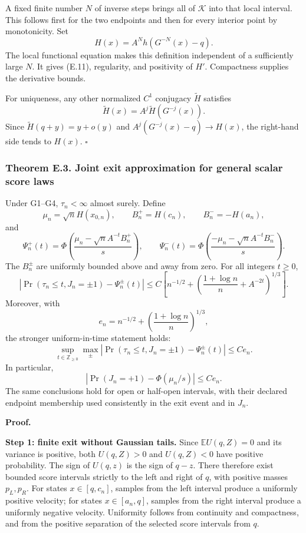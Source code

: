 A fixed finite number \(N\) of inverse steps brings all of
\(\mathcal K\) into that local interval. This follows first for the two
endpoints and then for every interior point by monotonicity. Set \[
H(x)=A^N h(G^{-N}(x)-q).
\tag{E.13}
\] The local functional equation makes this definition independent of a
sufficiently large \(N\). It gives (E.11), regularity, and positivity of
\(H'\). Compactness supplies the derivative bounds.

For uniqueness, any other normalized \(C^1\) conjugacy \(\widetilde H\)
satisfies \[
\widetilde H(x)=A^j\widetilde H(G^{-j}(x)).
\] Since \(\widetilde H(q+y)=y+o(y)\) and \(A^j(G^{-j}(x)-q)\to H(x)\),
the right-hand side tends to \(H(x)\). \(\square\)

\subsubsection{Theorem E.3. Joint exit approximation for general scalar
score
laws}\label{scalar_exit-theorem-e.3.-joint-exit-approximation-for-general-scalar-score-laws}

Under G1--G4, \(\tau_n<\infty\) almost surely. Define \[
\mu_n=\sqrt n H(x_{0,n}),\qquad
B_n^+=H(c_n),\qquad B_n^-=-H(a_n),
\tag{E.14}
\] and \[
\Psi_n^+(t)=
\Phi\!\left(\frac{\mu_n-\sqrt n A^{-t}B_n^+}{s}\right),
\qquad
\Psi_n^-(t)=
\Phi\!\left(\frac{-\mu_n-\sqrt n A^{-t}B_n^-}{s}\right).
\tag{E.15}
\] The \(B_n^\pm\) are uniformly bounded above and away from zero. For
all integers \(t\ge0\), \[
\left|\Pr(\tau_n\le t,J_n=\pm1)-\Psi_n^\pm(t)\right|
\le C\left[n^{-1/2}+
\left(\frac{1+\log n}{n}+A^{-2t}\right)^{1/3}\right].
\tag{E.16}
\] Moreover, with \[
e_n=n^{-1/2}+\left(\frac{1+\log n}{n}\right)^{1/3},
\tag{E.17}
\] the stronger uniform-in-time statement holds: \[
\sup_{t\in\mathbb Z_{\ge0}}
\max_{\pm}\left|\Pr(\tau_n\le t,J_n=\pm1)-\Psi_n^\pm(t)\right|
\le Ce_n.
\tag{E.18}
\] In particular, \[
\left|\Pr(J_n=+1)-\Phi(\mu_n/s)\right|\le Ce_n.
\tag{E.19}
\] The same conclusions hold for open or half-open intervals, with their
declared endpoint membership used consistently in the exit event and in
\(J_n\).

\textbf{Proof.}

\textbf{Step 1: finite exit without Gaussian tails.} Since
\(\mathbb E U(q,Z)=0\) and its variance is positive, both \(U(q,Z)>0\)
and \(U(q,Z)<0\) have positive probability. The sign of \(U(q,z)\) is
the sign of \(q-z\). There therefore exist bounded score intervals
strictly to the left and right of \(q\), with positive masses
\(p_L,p_R\). For states \(x\in[q,c_n]\), samples from the left interval
produce a uniformly positive velocity; for states \(x\in[a_n,q]\),
samples from the right interval produce a uniformly negative velocity.
Uniformity follows from continuity and compactness, and from the
positive separation of the selected score intervals from \(q\).

